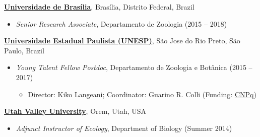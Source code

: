 \documentclass[margin,line]{res}
\begin{document}
\begin{resume}
\vspace*{-.1in}
{\bf \href{https://www.unb.br/}{Universidade de Bras\'{i}lia}}, Bras\'{i}lia, Distrito Federal, Brazil
\begin{itemize}
	\item[] \hspace*{-2mm} \textit{Senior Research Associate}, Departamento de Zoologia  (2015 -- 2018)
\end{itemize}
{\bf \href{https://www2.unesp.br/}{Universidade Estadual Paulista (UNESP)}}, S\~{a}o Jose do Rio Preto, S\~{a}o Paulo, Brazil
\begin{itemize}
	\item[] \hspace*{-2mm} \textit{Young Talent Fellow Postdoc}, Departamento de Zoologia e Bot\^{a}nica  (2015 -- 2017)
\begin{itemize}
	\item Director: Kiko Langeani; Coordinator: Guarino R. Colli (Funding: \href{http://www.cnpq.br/}{CNPq})
\end{itemize}
\end{itemize}
\vspace*{-.1in}
{\bf \href{https://www.uvu.edu}{Utah Valley University}}, Orem, Utah, USA
\begin{itemize}
	\item[] \hspace*{-2mm} \textit{Adjunct Instructor of Ecology}, Department of Biology  (Summer 2014)
\end{itemize}




\end{resume}
\end{document}
